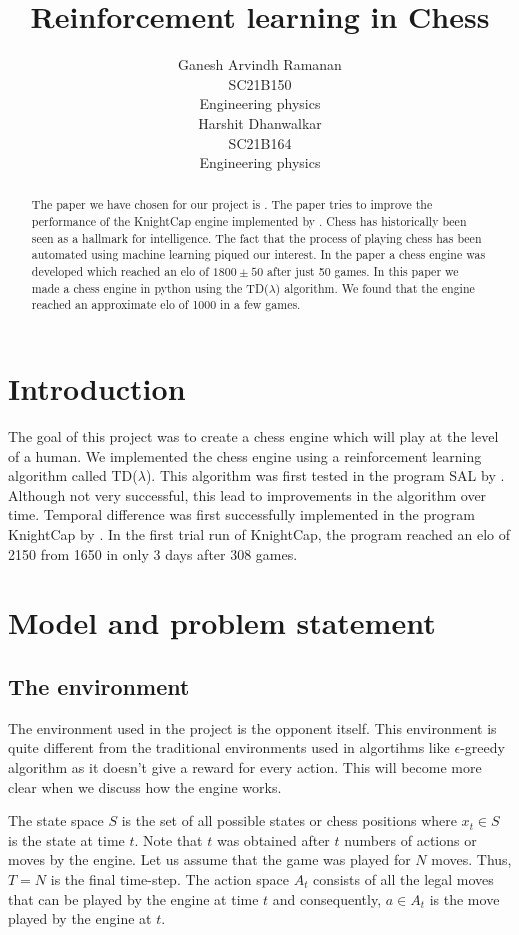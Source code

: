 \documentclass{article}
\title{Reinforcement learning in Chess}
\author{
    Ganesh Arvindh Ramanan \\ 
    SC21B150 \\ 
    Engineering physics \\ 
    \And
    Harshit Dhanwalkar \\ 
    SC21B164\\ 
    Engineering physics
}
\begin{document}
\maketitle
\begin{abstract}
	The paper we have chosen for our project is \citet{block2008using}. The paper tries to improve the performance of the KnightCap engine implemented by \citet{baxter1997knightcap, tridgell1997knightcap}. Chess has historically been seen as a hallmark for intelligence. The fact that the process of playing chess has been automated using machine learning piqued our interest. In the paper a chess engine was developed which reached an elo of $1800 \pm 50$ after just 50 games. In this paper we made a chess engine in python using the TD($\lambda$) algorithm. We found that the engine reached an approximate elo of 1000 in a few games.
\end{abstract}

\section{Introduction}
The goal of this project was to create a chess engine which will play at the level of a human. We implemented the chess engine using a reinforcement learning algorithm called TD($\lambda$). This algorithm was first tested in the program SAL by \citet{gherrity1993game}. Although not very successful, this lead to improvements in the algorithm over time. Temporal difference was first successfully implemented in the program KnightCap by \citet{baxter1997knightcap, tridgell1997knightcap}. In the first trial run of KnightCap, the program reached an elo of 2150 from 1650 in only 3 days after 308 games.

\section{Model and problem statement}
\subsection{The environment}
The environment used in the project is the opponent itself. This environment is quite different from the traditional environments used in algortihms like $\epsilon$-greedy algorithm as it doesn't give a reward for every action. This will become more clear when we discuss how the engine works.

The state space $S$ is the set of all possible states or chess positions where $x_t \in S$ is the state at time $t$. Note that $t$ was obtained after $t$ numbers of actions or moves by the engine. Let us assume that the game was played for $N$ moves. Thus, $T = N$ is the final time-step. The action space $A_t$ consists of all the legal moves that can be played by the engine at time $t$ and consequently, $a \in A_t$ is the move played by the engine at $t$.
\end{document}
